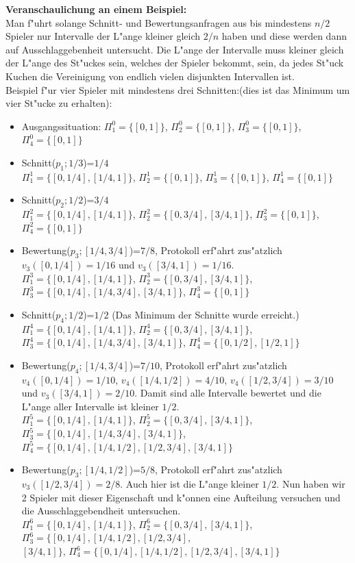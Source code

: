 \documentclass[11pt, a4paper, twoside]{article}
\numberwithin{equation}{section}
\begin{document}
\newline
\textbf{Veranschaulichung an einem Beispiel:}\\
Man f"uhrt solange Schnitt- und Bewertungsanfragen aus bis mindestens $n/2$ Spieler nur Intervalle der L"ange kleiner gleich $2/n$ haben und diese werden dann auf Ausschlaggebenheit untersucht. Die L"ange der Intervalle muss kleiner gleich der L"ange des St"uckes sein, welches der Spieler bekommt, sein, da jedes St"uck Kuchen die Vereinigung von endlich vielen disjunkten Intervallen ist.\\
\newline
Beispiel f"ur vier Spieler mit mindestens drei Schnitten:(dies ist das Minimum um vier St"ucke zu erhalten): 
\begin{itemize}
\item Ausgangssituation: $\Pi_1^0=\{[0,1]\}$, $\Pi_2^0=\{[0,1]\}$, $\Pi_3^0=\{[0,1]\}$, $\Pi_4^0=\{[0,1]\}$
\item  Schnitt($p_1;1/3$)=$1/4$ \\$\Pi_1^1=\{[0,1/4],[1/4,1]\}$, $\Pi_2^1=\{[0,1]\}$, $\Pi_3^1=\{[0,1]\}$, $\Pi_4^1=\{[0,1]\}$
\item  Schnitt($p_2;1/2$)=$3/4$ \\$\Pi_1^2=\{[0,1/4],[1/4,1]\}$, $\Pi_2^2=\{[0,3/4],[3/4,1]\}$, $\Pi_3^2=\{[0,1]\}$, $\Pi_4^2=\{[0,1]\}$
\item  Bewertung($p_3;[1/4,3/4]$)=$7/8$, Protokoll erf"ahrt zus"atzlich $v_3([0,1/4])=1/16$ und $v_3([3/4,1])=1/16$.\\ $\Pi_1^3=\{[0,1/4],[1/4,1]\}$, $\Pi_2^3=\{[0,3/4],[3/4,1]\}$, $\Pi_3^3=\{[0,1/4],[1/4,3/4],[3/4,1]\}$, $\Pi_4^3=\{[0,1]\}$
\item  Schnitt($p_4;1/2$)=$1/2$ (Das Minimum der Schnitte wurde erreicht.)\\ $\Pi_1^4=\{[0,1/4],[1/4,1]\}$, $\Pi_2^4=\{[0,3/4],[3/4,1]\}$, $\Pi_3^4=\{[0,1/4],[1/4,3/4],[3/4,1]\}$, $\Pi_4^4=\{[0,1/2],[1/2,1]\}$
\item  Bewertung($p_4;[1/4,3/4]$)=$7/10$, Protokoll erf"ahrt zus"atzlich $v_4([0,1/4])=1/10$, $v_4([1/4,1/2])=4/10$, $v_4([1/2,3/4])=3/10$ und $v_3([3/4,1])=2/10$. Damit sind alle Intervalle bewertet und die L"ange aller Intervalle ist kleiner $1/2$. \\ $\Pi_1^5=\{[0,1/4],[1/4,1]\}$, $\Pi_2^5=\{[0,3/4],[3/4,1]\}$, $\Pi_3^5=\{[0,1/4],[1/4,3/4],[3/4,1]\}$, $\Pi_4^5=\{[0,1/4],[1/4,1/2],[1/2,3/4],[3/4,1]\}$
\item Bewertung($p_3;[1/4,1/2]$)=$5/8$, Protokoll erf"ahrt zus"atzlich $v_3([1/2,3/4])=2/8$. Auch hier ist die L"ange kleiner $1/2$. Nun haben wir 2 Spieler mit dieser Eigenschaft und k"onnen eine Aufteilung versuchen und die Ausschlaggebendheit untersuchen.\\ $\Pi_1^6=\{[0,1/4],[1/4,1]\}$, $\Pi_2^6=\{[0,3/4],[3/4,1]\}$, $\Pi_3^6=\{[0,1/4],[1/4,1/2],[1/2,3/4],$\\ $[3/4,1]\}$, $\Pi_4^6=\{[0,1/4],[1/4,1/2],[1/2,3/4],[3/4,1]\}$

\end{itemize}
\end{document}
